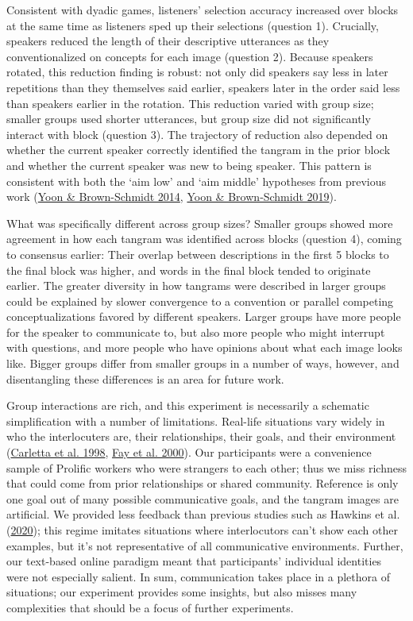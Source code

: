 \documentclass[
  english,
  a4paper,
]{article}
\begin{document}
Consistent with dyadic games, listeners' selection accuracy increased over blocks at the same time as listeners sped up their selections (question 1).
Crucially, speakers reduced the length of their descriptive utterances as they conventionalized on concepts for each image (question 2). Because speakers rotated, this reduction finding is robust: not only did speakers say less in later repetitions than they themselves said earlier, speakers later in the order said less than speakers earlier in the rotation. This reduction varied with group size; smaller groups used shorter utterances, but group size did not significantly interact with block (question 3). The trajectory of reduction also depended on whether the current speaker correctly identified the tangram in the prior block and whether the current speaker was new to being speaker. This pattern is consistent with both the `aim low' and `aim middle' hypotheses from previous work (\protect\hyperlink{ref-yoonAdjustingConceptualPacts2014}{Yoon \& Brown-Schmidt 2014}, \protect\hyperlink{ref-yoonAudienceDesignMultiparty2019}{Yoon \& Brown‐Schmidt 2019}).

What was specifically different across group sizes? Smaller groups showed more agreement in how each tangram was identified across blocks (question 4), coming to consensus earlier: Their overlap between descriptions in the first 5 blocks to the final block was higher, and words in the final block tended to originate earlier. The greater diversity in how tangrams were described in larger groups could be explained by slower convergence to a convention or parallel competing conceptualizations favored by different speakers. Larger groups have more people for the speaker to communicate to, but also more people who might interrupt with questions, and more people who have opinions about what each image looks like. Bigger groups differ from smaller groups in a number of ways, however, and disentangling these differences is an area for future work.

Group interactions are rich, and this experiment is necessarily a schematic simplification with a number of limitations. Real-life situations vary widely in who the interlocuters are, their relationships, their goals, and their environment (\protect\hyperlink{ref-carletta1998}{Carletta et al. 1998}, \protect\hyperlink{ref-fay2000}{Fay et al. 2000}). Our participants were a convenience sample of Prolific workers who were strangers to each other; thus we miss richness that could come from prior relationships or shared community. Reference is only one goal out of many possible communicative goals, and the tangram images are artificial.
We provided less feedback than previous studies such as Hawkins et al. (\protect\hyperlink{ref-hawkinsCharacterizingDynamicsLearning2020}{2020}); this regime imitates situations where interlocutors can't show each other examples, but it's not representative of all communicative environments. Further, our text-based online paradigm meant that participants' individual identities were not especially salient. In sum, communication takes place in a plethora of situations; our experiment provides some insights, but also misses many complexities that should be a focus of further experiments.
\end{document}
